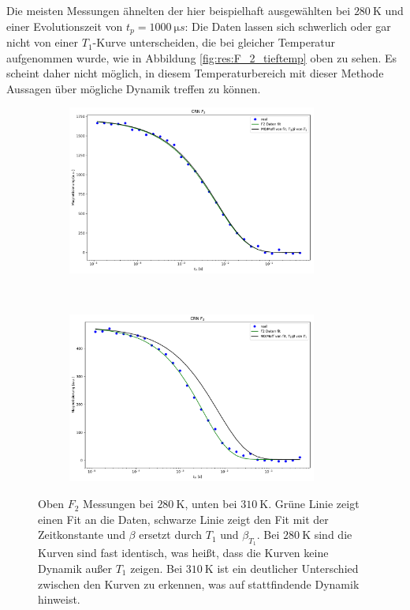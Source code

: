 Die meisten Messungen ähnelten der hier beispielhaft ausgewählten bei $\SI{280}{\kelvin}$ und einer Evolutionszeit von $t_p = \SI{1000}{\micro s}$: Die Daten lassen sich schwerlich oder gar nicht von einer $T_1$-Kurve unterscheiden, die bei gleicher Temperatur aufgenommen wurde, wie in Abbildung \ref{fig:res:F_2_tieftemp} oben zu sehen. Es scheint daher nicht möglich, in diesem Temperaturbereich mit dieser Methode Aussagen über mögliche Dynamik treffen zu können.
\begin{figure}
	\centering
	\begin{subfigure}{\textwidth}
		\centering
		\includegraphics[width=0.9\textwidth]{graphics/plots/F2/f2_tieftemp.pdf}
	\end{subfigure} \\
	\begin{subfigure}{\textwidth}
		\centering
		\includegraphics[width=0.9\textwidth]{graphics/plots/F2/f2_fits.pdf}
	\end{subfigure}
	\caption{Oben $F_2$ Messungen bei $\SI{280}{\kelvin}$, unten bei $\SI{310}{\kelvin}$. Grüne Linie zeigt einen Fit an die Daten, schwarze Linie zeigt den Fit mit der Zeitkonstante und $\beta$ ersetzt durch $T_1$ und $\beta_{T_1}$. Bei $\SI{280}{\kelvin}$ sind die Kurven sind fast identisch, was heißt, dass die Kurven keine Dynamik außer $T_1$ zeigen. Bei $\SI{310}{\kelvin}$ ist ein deutlicher Unterschied zwischen den Kurven zu erkennen, was auf stattfindende Dynamik hinweist.}
	\label{fig:res:F_2_tieftemp}
	\label{fig:res:F_2_fit}
\end{figure}

